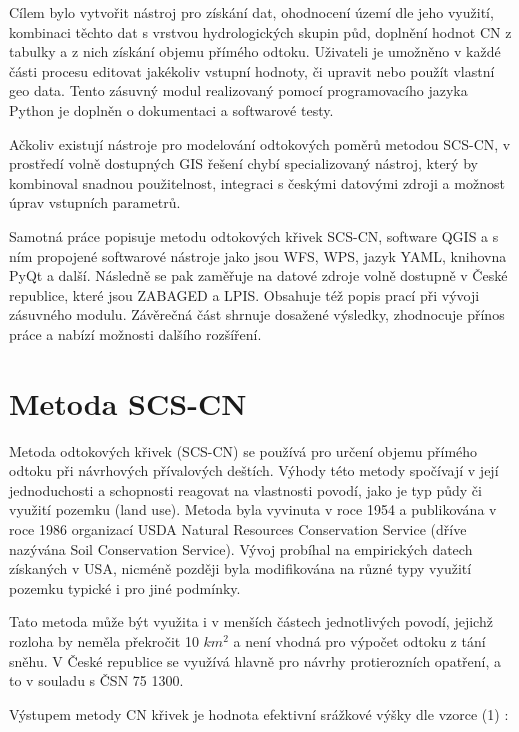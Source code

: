 \documentclass[a4paper,oneside,12pt]{book}
\begin{document}
Cílem bylo vytvořit nástroj pro získání dat, ohodnocení území dle jeho využití, kombinaci těchto dat s vrstvou hydrologických skupin půd, doplnění hodnot CN z tabulky a z nich získání objemu přímého odtoku. Uživateli je umožněno v každé části procesu editovat jakékoliv vstupní hodnoty, či upravit nebo použít vlastní geo data. Tento zásuvný modul realizovaný pomocí programovacího jazyka Python je doplněn o dokumentaci a softwarové testy. 

Ačkoliv existují nástroje pro modelování odtokových poměrů metodou SCS-CN, v prostředí volně dostupných GIS řešení chybí specializovaný nástroj, který by kombinoval snadnou použitelnost, integraci s českými datovými zdroji a možnost úprav vstupních parametrů.

Samotná práce popisuje metodu odtokových křivek SCS-CN, software QGIS a s ním propojené softwarové nástroje jako jsou WFS, WPS, jazyk YAML, knihovna PyQt a další. Následně se pak zaměřuje na  datové zdroje volně dostupně v České republice, které jsou ZABAGED a LPIS. Obsahuje též popis prací při vývoji zásuvného modulu. Závěrečná část shrnuje dosažené výsledky, zhodnocuje přínos práce a nabízí možnosti dalšího rozšíření.



\newpage
\chapter{Metoda SCS-CN} \label{SCSCN}
\hspace{10mm} Metoda odtokových křivek (SCS-CN) se používá pro určení objemu přímého odtoku při návrhových přívalových deštích. Výhody této metody spočívají v její jednoduchosti a schopnosti reagovat na vlastnosti povodí, jako je typ půdy či využití pozemku (land use). Metoda byla vyvinuta v roce 1954 a publikována v roce 1986 organizací USDA Natural Resources Conservation Service (dříve nazývána Soil Conservation Service). \cite{MNYDGwleJOjKLRUp} Vývoj probíhal na empirických datech získaných v USA, nicméně později byla modifikována na různé typy využití pozemku typické i pro jiné podmínky. \cite{Holman2003}\cite{Lian2020}

\hspace{10mm} Tato metoda může být využita i v menších částech jednotlivých povodí, jejichž rozloha by neměla překročit 10 $km^{2}$ a není vhodná pro výpočet odtoku z tání sněhu. V České republice se využívá hlavně pro návrhy protierozních opatření, a to v souladu s ČSN 75 1300. \cite{MNYDGwleJOjKdRUp}

Výstupem metody CN křivek je hodnota efektivní srážkové výšky dle vzorce (1) \cite{MNYDGwleJOjKLRU2}:
\end{document}
